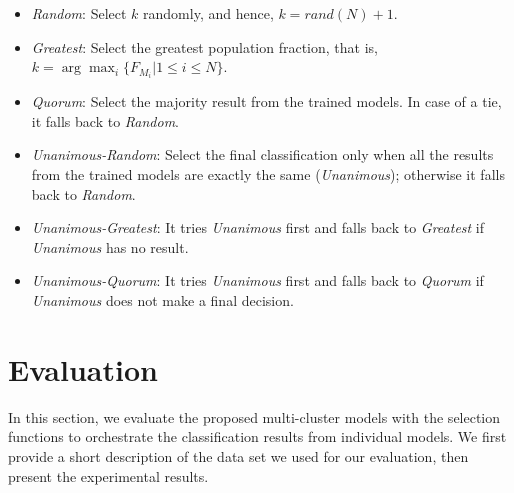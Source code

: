 \documentclass[conference]{IEEEtran}
\begin{document}
\begin{itemize} \itemsep3pt \parskip3pt 
	\item \emph{Random}:
    Select $k$ randomly, and hence, $k = rand(N)+1$.
	\item \emph{Greatest}:
    Select the greatest population fraction, that is, $k = \arg\max_i \{ F_{M_i} | 1 \leq i \leq N \}$.
	\item \emph{Quorum}:
	Select the majority result from the trained models. 
    In case of a tie, it falls back to \emph{Random}.
	\item \emph{Unanimous-Random}:
	Select the final classification only when all the results from the trained models are exactly the same (\emph{Unanimous}); otherwise it falls back to \emph{Random}.
	\item \emph{Unanimous-Greatest}:
	It tries \emph{Unanimous} first and falls back to \emph{Greatest} if \emph{Unanimous} has no result.
	\item \emph{Unanimous-Quorum}:
	It tries \emph{Unanimous} first and falls back to \emph{Quorum} if \emph{Unanimous} does not make a final decision.
\end{itemize}

\section{Evaluation}
\label{sec:eval}

In this section, we evaluate the proposed multi-cluster models with the selection functions to orchestrate the classification results from individual models.
We first provide a short description of the data set we used for our evaluation, then present the experimental results.

\end{document}
